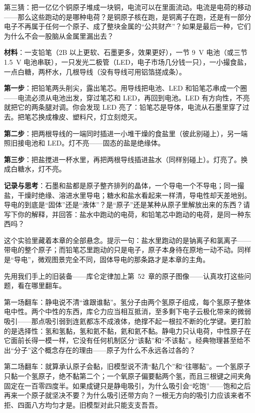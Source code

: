 第三猜：把一亿亿个铜原子堆成一块铜，电流可以在里面流动。电流是电荷的移动——那么这些跑动的是哪种电荷？是铜原子核在跑，是铜离子在跑，还是有一部分电子不再属于任何一个原子、成了整块金属的“公共财产”？如果是最后一种，它们为什么不会一股脑从金属里漏出去？


\begin{experiment}[铅笔芯是导体吗]
\textbf{材料}：一支铅笔（2B 以上更软、石墨更多，效果更好），一节 9~V 电池（或三节 1.5~V 电池串联），一只发光二极管（LED，电子市场几分钱一只），一小撮食盐，一点白糖，两杯水，几根导线（没有导线可用铝箔搓成条）。

\textbf{第一步}：把铅笔两头削尖，露出笔芯。用导线把电池、LED 和铅笔芯串成一个圈——电流必须从电池出发，穿过笔芯和 LED，再回到电池。LED 有方向性，不亮就把它的两条腿对调。你会发现 LED 亮了：铅笔芯是导体，电流从石墨里穿了过去。把笔芯换成橡皮、塑料尺，灯立刻熄灭。

\textbf{第二步}：把两根导线的一端同时插进一小堆干燥的食盐里（彼此别碰上），另一端照旧接电池和 LED。灯不亮——固态的盐是绝缘体。

\textbf{第三步}：把盐搅进一杯水里，再把两根导线插进盐水（同样别碰上）。灯亮了。换成白糖水，灯不亮。

\textbf{记录与思考}：石墨和盐都是原子整齐排列的晶体，一个导电一个不导电；同一撮盐，干燥时绝缘、溶进水里导电；糖水和盐水看起来一样清，导电性却天差地别。导电的到底是“固体”还是“液体”？是“原子”还是某种从原子里解放出来的东西？请写下你的解释，并回答：盐水中跑动的电荷，和铅笔芯中跑动的电荷，是同一种东西吗？
\end{experiment}

这个实验里藏着本章的全部悬念。提示一句：盐水里跑动的是钠离子和氯离子——带电的整个原子；而铅笔芯里跑动的只是电子，原子本身待在原地一动不动。同样是“导电”，微观图景完全不同，固体导电的那条路才是本章的主角。


先用我们手上的旧装备——库仑定律加上第~52~章的原子图像——认真攻打这些问题，看在哪里翻车。

第一场翻车：静电说不清“谁跟谁黏”。氢分子由两个氢原子组成，每个氢原子整体电中性。两个中性的东西，库仑力应当相互抵消，至多剩下电子云极化带来的微弱吸引——那点吸引弱到连氦都冻不成液体，绝撑不起一根拉不断的化学键。更打脸的是选择性：氢和氢黏，氢和氦不黏，氦和氦不黏。静电力只认电荷，中性原子在它面前长得一模一样，它没有任何机制区分“该黏”和“不该黏”。经典物理甚至给不出“分子”这个概念存在的理由——原子为什么不永远各过各的？

第二场翻车：就算承认原子会黏，旧模型说不清“黏几个”和“往哪黏”。一个氢原子只黏一个氢原子，绝不黏第二个；一个氧原子偏要黏两个氢，而且三根键之间夹角固定在一百零四度半。如果成键只是静电吸引，为什么吸引会“吃饱”——饱和之后再来一个原子就坚决不要？为什么吸引还带方向？一根无方向的吸引力应该来者不拒、四面八方均匀才是。旧模型对此只能支支吾吾。

